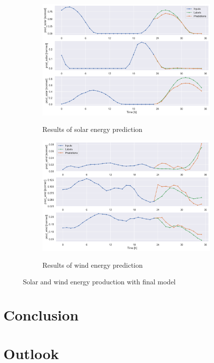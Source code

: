 \documentclass[11pt,table]{article}
\begin{document}
\begin{figure}[H]
\centering
\begin{subfigure}{.5\textwidth}
  \centering
  \includegraphics[width=0.9\linewidth]{Figures/solarResults.png}
  \label{fig:fourierWind}
  \caption{Results of solar energy prediction}
\end{subfigure}%
\begin{subfigure}{.5\textwidth}
  \centering
  \includegraphics[width=0.9\linewidth]{Figures/windResults.png}
  \label{fig:fourierSolar}
  \caption{Results of wind energy prediction}
\end{subfigure}
\caption{Solar and wind energy production with final model}
\label{fig:fourier}
\end{figure}

\section{Conclusion}
\section{Outlook}
\end{document}
